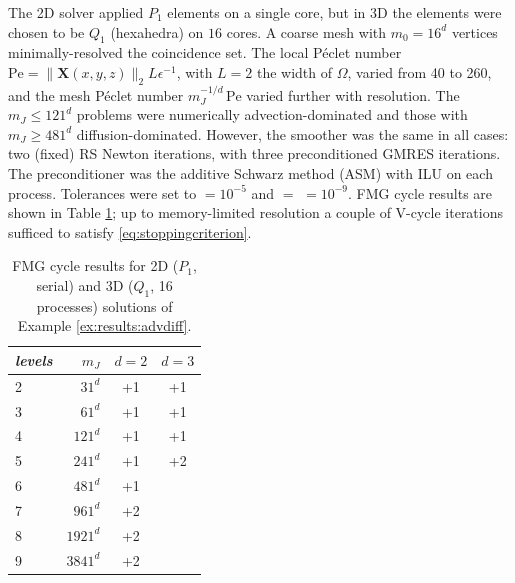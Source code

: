 \documentclass[review,hidelinks,onefignum,onetabnum,final]{siamart220329}  %
\newcommand{\eps}{\epsilon}
\newcommand{\bX}{\mathbf{X}}
\begin{document}
\begin{example}
The 2D solver applied $P_1$ elements on a single core, but in 3D the elements were chosen to be $Q_1$ (hexahedra) on $16$ cores.  A coarse mesh with $m_0=16^d$ vertices minimally-resolved the coincidence set.  The local Péclet number $\text{Pe}=\|\bX(x,y,z)\|_2 L \eps^{-1}$, with $L=2$ the width of $\Omega$, varied from 40 to 260, and the mesh Péclet number $m_J^{-1/d}\,\text{Pe}$ varied further with resolution.  The $m_J\le 121^d$ problems were numerically advection-dominated and those with $m_J\ge 481^d$ diffusion-dominated.  However, the smoother was the same in all cases: two (fixed) RS Newton iterations, with three preconditioned GMRES iterations.  The preconditioner was the additive Schwarz method (ASM) with ILU on each process.  Tolerances were set to  $=10^{-5}$ and  $=$  $= 10^{-9}$.  FMG cycle results are shown in Table \ref{tab:results:advdiff}; up to memory-limited resolution a couple of V-cycle iterations sufficed to satisfy \eqref{eq:stoppingcriterion}.
\end{example}

\begin{table}[ht]
\centering
\begin{tabular}{lr@{\hskip 7mm}c@{\hskip 4mm}c}
\toprule
\emph{levels} & $m_J$ & $d=2$ & $d=3$ \\
\midrule
 2 &    $31^d$ & +1 & +1 \\
 3 &    $61^d$ & +1 & +1 \\
 4 &   $121^d$ & +1 & +1 \\
 5 &   $241^d$ & +1 & +2 \\
 6 &   $481^d$ & +1 &  \\
 7 &   $961^d$ & +2 &  \\
 8 &  $1921^d$ & +2 &  \\
 9 &  $3841^d$ & +2 &  \\
\bottomrule
\end{tabular}
\bigskip
\caption{FMG cycle results for 2D ($P_1$, serial) and 3D ($Q_1$, 16 processes) solutions of Example \ref{ex:results:advdiff}.}
\label{tab:results:advdiff}
\end{table}
\end{document}
